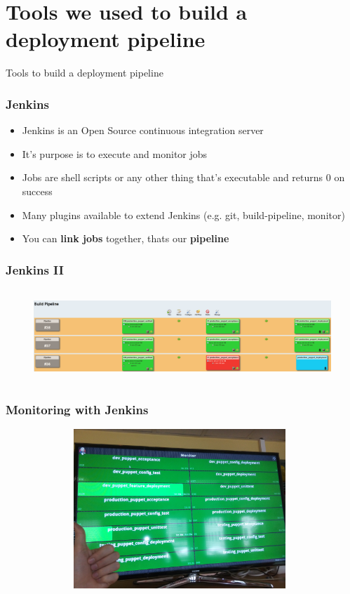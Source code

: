 \documentclass{beamer}
\begin{document}
\section{Tools we used to build a deployment pipeline}
\begin{frame}
  \center \huge Tools to build a deployment pipeline
\end{frame}


\begin{frame}
  \frametitle{Jenkins}

  \begin{itemize}
  \item Jenkins is an Open Source continuous integration server
  \item It's purpose is to execute and monitor jobs
  \item Jobs are shell scripts or any other thing that's executable
    and returns 0 on success
  \item Many plugins available to extend Jenkins (e.g. git, build-pipeline, monitor)
  \item You can \textbf{link jobs} together, thats our \textbf{pipeline}
  \end{itemize}

\end{frame}


\begin{frame}
  \frametitle{Jenkins II}
  \begin{figure}[ht]
    \centering
      \includegraphics[height=3.5cm,width=11.5cm]{../pics/jenkins_pipeline}
    \label{fig:stack}
  \end{figure}
\end{frame}


\begin{frame}
  \frametitle{Monitoring with Jenkins}
  \begin{figure}[ht]
    \centering
      \includegraphics[height=6cm,width=11cm]{../pics/jenkins_monitor_live}
    \label{fig:stack}
  \end{figure}
\end{frame}
\end{document}
